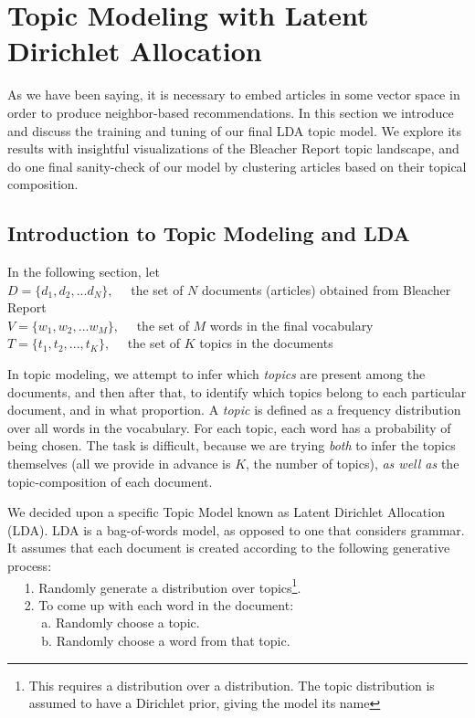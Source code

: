 \documentclass[11pt]{article}
\begin{document}
\section{Topic Modeling with Latent Dirichlet Allocation}
As we have been saying, it is necessary to embed articles in some vector space in order to produce neighbor-based recommendations. In this section we introduce and discuss the training and tuning of our final LDA topic model. We explore its results with insightful visualizations of the Bleacher Report topic landscape, and do one final sanity-check of our model by clustering articles based on their topical composition. 

\subsection{Introduction to Topic Modeling and LDA}
In the following section, let \\
$D = \{d_1, d_2, ... d_N \}, \quad$ the set of $N$ documents (articles) obtained from Bleacher Report \\
$V = \{w_1, w_2, ... w_M \}, \quad$ the set of $M$ words in the final vocabulary \\
$T = \{t_1, t_2, ..., t_K\}, \quad$ the set of $K$ topics in the documents 

In topic modeling, we attempt to infer which \textit{topics} are present among the documents, and then after that, to identify which topics belong to each particular document, and in what proportion.  A \textit{topic} is defined as a frequency distribution over all words in the vocabulary.  For each topic, each word has a probability of being chosen.  The task is difficult, because we are trying \textit{both} to infer the topics themselves (all we provide in advance is $K$, the number of topics), \textit{as well as} the topic-composition of each document.

We decided upon a specific Topic Model known as Latent Dirichlet Allocation (LDA). LDA is a bag-of-words model, as opposed to one that considers grammar.  It assumes that each document is created according to the following generative process: \\
$\text{} \quad$ 1. Randomly generate a distribution over topics\footnote{This requires a distribution over a distribution. The  topic distribution is assumed to have a Dirichlet prior, giving the model its name}. \\
$\text{} \quad$ 2. To come up with each word in the document: \\
$\text{} \quad$ $\quad$ a. Randomly choose a topic. \\
$\text{} \quad$ $\quad$ b. Randomly choose a word from that topic. 
\end{document}
